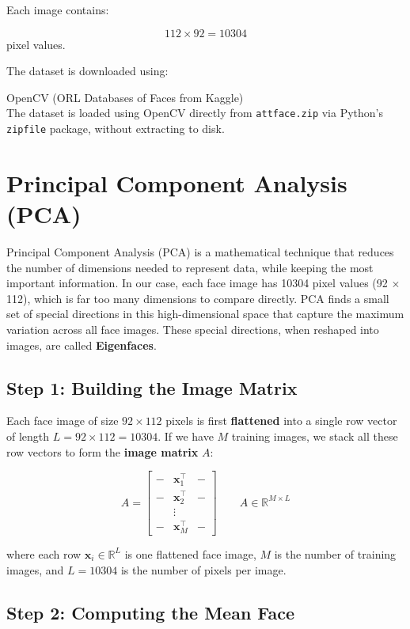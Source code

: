 \documentclass[12pt,a4paper]{article}
\begin{document}
Each image contains:

\[
112 \times 92 = 10304
\]
pixel values.

The dataset is downloaded using:


OpenCV (ORL Databases of Faces from Kaggle)\\
The dataset is loaded using OpenCV directly from \texttt{attface.zip}
via Python's \texttt{zipfile} package, without extracting to disk.




\section{Principal Component Analysis (PCA)}

Principal Component Analysis (PCA) is a mathematical technique that reduces the
number of dimensions needed to represent data, while keeping the most important
information. In our case, each face image has 10304 pixel values (92 $\times$ 112),
which is far too many dimensions to compare directly. PCA finds a small set of
special directions in this high-dimensional space that capture the maximum variation
across all face images. These special directions, when reshaped into images, are
called \textbf{Eigenfaces}.

\subsection{Step 1: Building the Image Matrix}

Each face image of size $92 \times 112$ pixels is first \textbf{flattened} into a
single row vector of length $L = 92 \times 112 = 10304$. If we have $M$ training
images, we stack all these row vectors to form the \textbf{image matrix} $A$:

\[
A =
\begin{bmatrix}
- & \mathbf{x}_1^\top & - \\
- & \mathbf{x}_2^\top & - \\
  & \vdots            &   \\
- & \mathbf{x}_M^\top & -
\end{bmatrix}
\qquad A \in \mathbb{R}^{M \times L}
\]

where each row $\mathbf{x}_i \in \mathbb{R}^L$ is one flattened face image, $M$ is
the number of training images, and $L = 10304$ is the number of pixels per image.

\subsection{Step 2: Computing the Mean Face}
\end{document}
